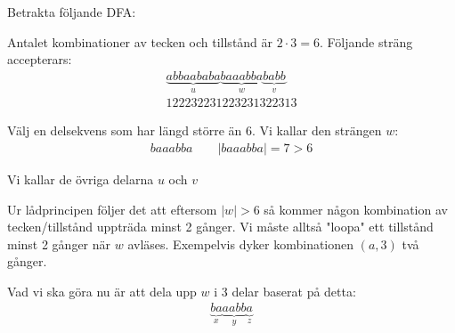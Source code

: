 \noindent Betrakta följande DFA:
\begin{figure}[ht!]
    \centering
    \caption{}
\end{figure}\par
\noindent Antalet kombinationer av tecken och tillstånd är $2\cdot 3=6$. Följande sträng accepterars:
\begin{equation*}
  \begin{gathered}
    \underbrace{abbaababa}_{\text{$u$}}\underbrace{baaabba}_{\text{$w$}}\underbrace{babb}_{\text{$v$}}\\
    122232231223231322313
  \end{gathered}
\end{equation*}\par
\noindent Välj en delsekvens som har längd större än 6. Vi kallar den strängen $w$:
\begin{equation*}
  \begin{gathered}
    baaabba\qquad \left|baaabba\right| = 7>6
  \end{gathered}
\end{equation*}\par
\noindent Vi kallar de övriga delarna $u$ och $v$
\par\bigskip
\noindent Ur lådprincipen följer det att eftersom $\left|w\right|>6$ så kommer någon kombination av tecken/tillstånd uppträda minst 2 gånger. Vi måste alltså "loopa" ett tillstånd minst 2 gånger när $w$ avläses. Exempelvis dyker kombinationen $(a,3)$ två gånger.
\par\bigskip
\noindent Vad vi ska göra nu är att dela upp $w$ i 3 delar baserat på detta:
\begin{equation*}
  \begin{gathered}
  \underbrace{ba}_{\text{$x$}}\underbrace{aabb}_{\text{$y$}}\underbrace{a}_{\text{$z$}}
  \end{gathered}
\end{equation*}\par
